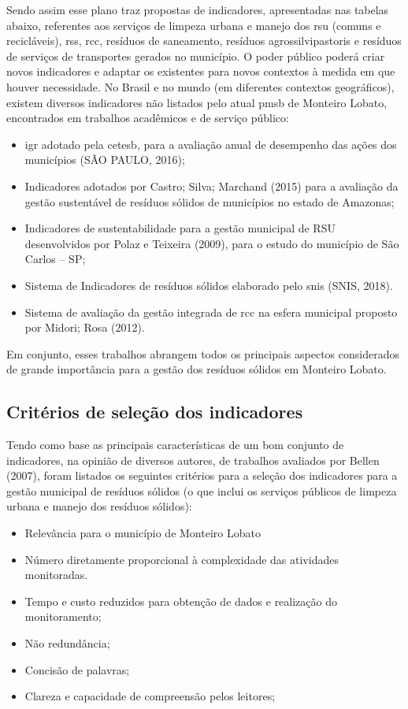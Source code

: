 Sendo assim esse plano traz propostas de indicadores, apresentadas nas tabelas abaixo, referentes aos serviços de limpeza urbana e manejo dos \gls{rsu} (comuns e recicláveis), \gls{rss}, \gls{rcc}, resíduos de saneamento, resíduos agrossilvipastoris e resíduos de serviços de transportes gerados no município. O poder público poderá criar novos indicadores e adaptar os existentes para novos contextos à medida em que houver necessidade.
No Brasil e no mundo (em diferentes contextos geográficos), existem diversos indicadores não listados pelo atual \gls{pmsb} de Monteiro Lobato, encontrados em trabalhos acadêmicos e de serviço público:

\begin{itemize}
	\item \gls{igr} adotado pela \gls{cetesb}, para a avaliação anual de desempenho das ações dos municípios (SÃO PAULO, 2016);
	\item Indicadores adotados por Castro; Silva; Marchand (2015) para a avaliação da gestão sustentável de resíduos sólidos de municípios no estado de Amazonas;
	\item Indicadores de sustentabilidade para a gestão municipal de RSU desenvolvidos por Polaz e Teixeira (2009), para o estudo do município de São Carlos – SP;
	\item Sistema de Indicadores de resíduos sólidos elaborado pelo \gls{snis} (SNIS, 2018).
	\item Sistema de avaliação da gestão integrada de \gls{rcc} na esfera municipal proposto por Midori; Rosa (2012).
\end{itemize}

Em conjunto, esses trabalhos abrangem todos os principais aspectos considerados de grande importância para a gestão dos resíduos sólidos em Monteiro Lobato. 

\subsection{Critérios de seleção dos indicadores}

Tendo como base as principais características de um bom conjunto de indicadores, na opinião de diversos autores, de trabalhos avaliados por Bellen (2007), foram listados os seguintes critérios para a seleção dos indicadores para a gestão municipal de resíduos sólidos (o que inclui os serviços públicos de limpeza urbana e manejo dos resíduos sólidos):

\begin{itemize}
	\item Relevância para o município de Monteiro Lobato
	\item Número diretamente proporcional à complexidade das atividades monitoradas.
	\item Tempo e custo reduzidos para obtenção de dados e realização do monitoramento;
	\item Não redundância;
	\item Concisão de palavras;
	\item Clareza e capacidade de compreensão pelos leitores;
	
\end{itemize}

